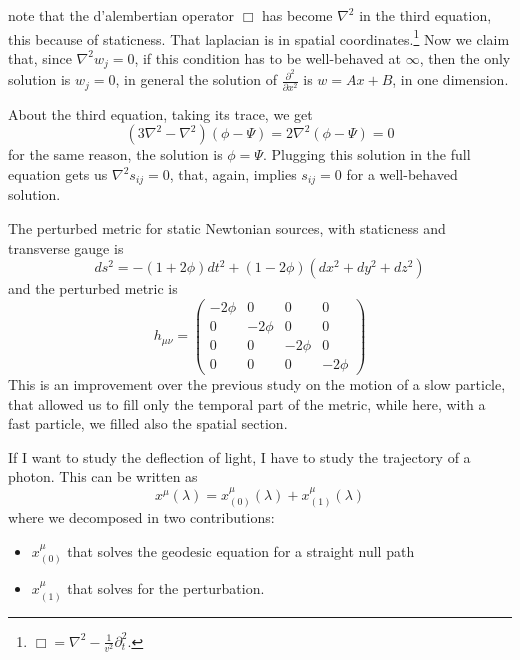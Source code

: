 note that the d'alembertian operator $\Box$ has become $\nabla ^{2}$ in the third equation, this because of staticness. That laplacian is in spatial coordinates.\footnote{ $\Box = \nabla ^{2} - \frac{1}{v^{2}}\partial_{t}^{2}$.}
Now we claim that, since $\nabla ^{2}w_{j} = 0$, if this condition has to be well-behaved at $\infty$, then the only solution is $w_{j} = 0$, in general the solution of $\frac{\partial^{2} }{\partial x^{2}} $ is $w = Ax+B$, in one dimension.\par
About the third equation, taking its trace, we get
\[
	\left(3\nabla ^{2} -\nabla ^{2}\right) \left( \phi -\Psi  \right) = 2\nabla ^{2}\left( \phi -\Psi  \right)= 0
\]
for the same reason, the solution is $\phi =\Psi  $. Plugging this solution in the full equation gets us $\nabla ^{2}s_{ij} = 0$, that, again, implies $s_{ij} = 0$ for a well-behaved solution.\par
The perturbed metric for static Newtonian sources, with staticness and transverse gauge is
\begin{equation}
ds^{2} = - \left( 1+2\phi  \right)dt^{2}+ \left( 1-2\phi  \right)\left( dx^{2}+dy^{2}+dz^{2} \right)
\end{equation}
and the perturbed metric is
\begin{equation}
h_{\mu \nu } = \begin{pmatrix}
-2\phi  & 0 & 0 & 0 \\
0 & -2\phi  & 0 & 0 \\
0 & 0 & -2\phi  & 0 \\
0 & 0 & 0 & -2\phi 
\end{pmatrix} 
\end{equation}
This is an improvement over the previous study on the motion of a slow particle, that allowed us to fill only the temporal part of the metric, while here, with a fast particle, we filled also the spatial section.\par
If I want to study the deflection of light, I have to study the trajectory of a photon. This can be written as 
\[
x^{\mu }\left( \lambda  \right) = x^{\mu }_{\left( 0 \right)}\left( \lambda  \right) + x^{\mu }_{\left( 1 \right)}\left( \lambda  \right)
\]
where we decomposed in two contributions:
\begin{itemize}
\item $x^{\mu }_{\left( 0 \right)}$ that solves the geodesic equation for a straight null path
\item $x^{\mu }_{\left( 1 \right)}$ that solves for the perturbation.
\end{itemize}
